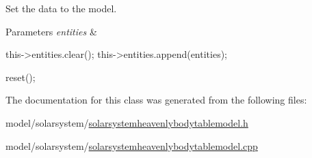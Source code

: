 \-Set the data to the model. 


\begin{DoxyParams}{\-Parameters}
{\em entities} & \\
\hline
\end{DoxyParams}

\begin{DoxyCode}
{
    this->entities.clear();
    this->entities.append(entities);

    reset();
}
\end{DoxyCode}


\-The documentation for this class was generated from the following files\-:\begin{DoxyCompactItemize}
\item 
model/solarsystem/\hyperlink{solarsystemheavenlybodytablemodel_8h}{solarsystemheavenlybodytablemodel.\-h}\item 
model/solarsystem/\hyperlink{solarsystemheavenlybodytablemodel_8cpp}{solarsystemheavenlybodytablemodel.\-cpp}\end{DoxyCompactItemize}
